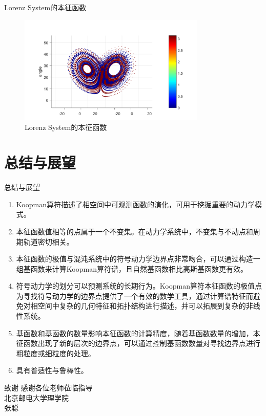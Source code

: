 \documentclass{beamer}
\begin{document}
		\begin{frame}{Lorenz System的本征函数}
			\begin{figure}
				\centering
				\includegraphics[width=3.5in]{figure/lorenz_eigen_bin}
				\caption{Lorenz System的本征函数}
			\end{figure}
		\end{frame}


\section{总结与展望}
\begin{frame}{总结与展望}
	\begin{enumerate}
		\small
		\item Koopman算符描述了相空间中可观测函数的演化，可用于挖掘重要的动力学模式。
		\item 本征函数值相等的点属于一个不变集。在动力学系统中，不变集与不动点和周期轨道密切相关。
		\item 本征函数的极值与混沌系统中的符号动力学边界点非常吻合，可以通过构造一组基函数来计算Koopman算符谱，且自然基函数相比高斯基函数更有效。
		\item 符号动力学的划分可以预测系统的长期行为。Koopman算符本征函数的极值点为寻找符号动力学的边界点提供了一个有效的数学工具，通过计算谱特征而避免对相空间中复杂的几何特征和拓扑结构进行描述，并可以拓展到复杂的非线性系统。
		\item 基函数和基函数的数量影响本征函数的计算精度，随着基函数数量的增加，本征函数出现了新的层次的边界点，可以通过控制基函数数量对寻找边界点进行粗粒度或细粒度的处理。
		\item 具有普适性与鲁棒性。
	\end{enumerate}
\end{frame}

\begin{frame}{致谢}
\centering
\huge 感谢各位老师莅临指导\\[30pt]
\normalsize 北京邮电大学理学院\\
张聪
\end{frame}
\end{document}

